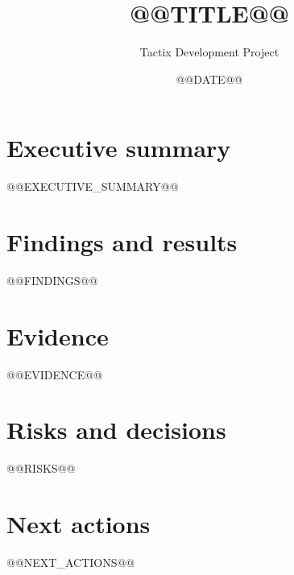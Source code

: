 \documentclass[11pt]{article}
\title{@@TITLE@@}
\author{Tactix Development Project}
\date{@@DATE@@}
\begin{document}
\maketitle

\section*{Executive summary}
@@EXECUTIVE_SUMMARY@@

\section{Findings and results}
@@FINDINGS@@

\section{Evidence}
@@EVIDENCE@@

\section{Risks and decisions}
@@RISKS@@

\section{Next actions}
@@NEXT_ACTIONS@@
\end{document}
